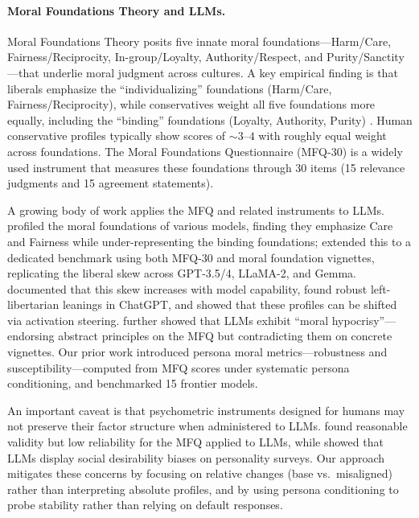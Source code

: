 \documentclass{article}
\begin{document}
\paragraph{Moral Foundations Theory and LLMs.}
Moral Foundations Theory \citep{haidt2007when,graham2009liberals,moralfoundations2017questionnaires} posits five innate moral foundations---Harm/Care, Fairness/Reciprocity, In-group/Loyalty, Authority/Respect, and Purity/Sanctity---that underlie moral judgment across cultures. A key empirical finding is that liberals emphasize the ``individualizing'' foundations (Harm/Care, Fairness/Reciprocity), while conservatives weight all five foundations more equally, including the ``binding'' foundations (Loyalty, Authority, Purity) \citep{graham2009liberals}. Human conservative profiles typically show scores of ${\sim}3$--$4$ with roughly equal weight across foundations. The Moral Foundations Questionnaire (MFQ-30) \citep{graham2011mfq} is a widely used instrument that measures these foundations through 30 items (15 relevance judgments and 15 agreement statements).

A growing body of work applies the MFQ and related instruments to LLMs. \citet{abdulhai-etal-2024-moral} profiled the moral foundations of various models, finding they emphasize Care and Fairness while under-representing the binding foundations; \citet{ji2024moralbench} extended this to a dedicated benchmark using both MFQ-30 and moral foundation vignettes, replicating the liberal skew across GPT-3.5/4, LLaMA-2, and Gemma. \citet{kirgis2025differences} documented that this skew increases with model capability, \citet{hartmann2023political} found robust left-libertarian leanings in ChatGPT, and \citet{tlaie2024moral} showed that these profiles can be shifted via activation steering. \citet{nunes2024moral} further showed that LLMs exhibit ``moral hypocrisy''---endorsing abstract principles on the MFQ but contradicting them on concrete vignettes. Our prior work \citep{costa2025moral} introduced persona moral metrics---robustness and susceptibility---computed from MFQ scores under systematic persona conditioning, and benchmarked 15 frontier models.

An important caveat is that psychometric instruments designed for humans may not preserve their factor structure when administered to LLMs. \citet{psychometric2025validity} found reasonable validity but low reliability for the MFQ applied to LLMs, while \citet{salecha2024desirability} showed that LLMs display social desirability biases on personality surveys. Our approach mitigates these concerns by focusing on relative changes (base vs.\ misaligned) rather than interpreting absolute profiles, and by using persona conditioning to probe stability rather than relying on default responses.
\end{document}
